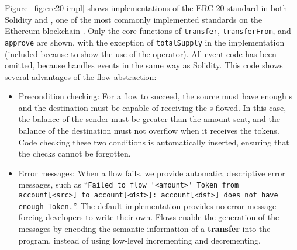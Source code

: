 \documentclass[sigconf]{acmart}
\begin{document}
Figure~\ref{fig:erc20-impl} shows implementations of the ERC-20  standard in both Solidity and \langName, one of the most commonly implemented standards on the Ethereum blockchain .
Only the core functions of \lstinline{transfer}, \lstinline{transferFrom}, and \lstinline{approve} are shown, with the exception of \lstinline{totalSupply} in the \langName implementation (included because to show the use of the \total operator).
All event code has been omitted, because \langName handles events in the same way as Solidity.
This code shows several advantages of the flow abstraction:
\begin{itemize}
    \item Precondition checking: For a flow to succeed, the source must have enough \assetTxt{}s and the destination must be capable of receiving the \assetTxt{}s flowed.
        In this case, the balance of the sender must be greater than the amount sent, and the balance of the destination must not overflow when it receives the tokens.
        Code checking these two conditions is automatically inserted, ensuring that the checks cannot be forgotten.
    \item Error messages: When a flow fails, we provide  automatic, descriptive error messages, such as ``\lstinline{Failed to flow '<amount>' Token from account[<src>] to account[<dst>]: account[<dst>] does not have enough Token.}''.
        The default implementation provides no error message forcing developers to write their own.
        Flows enable the generation of the messages by encoding the semantic information of a \textbf{transfer} into the program, instead of using low-level incrementing and decrementing.
\end{itemize}

\begin{figure*}[h]
    \centering
    \begin{minipage}[t]{0.5\textwidth}
        
    \end{minipage}%
    \begin{minipage}[t]{0.5\textwidth}
        
    \end{minipage}
    \caption{A Solidity and a \langName implementation of the core functions of the ERC-20 standard.}
    \label{fig:erc20-impl}
\end{figure*}
\end{document}
